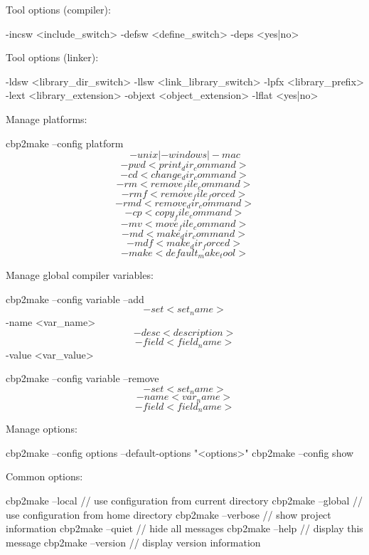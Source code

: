 Tool options (compiler):
\begin{code}
    -incsw <include_switch> -defsw <define_switch> -deps <yes|no>
\end{code}

Tool options (linker):
\begin{code}
    -ldsw <library_dir_switch> -llsw <link_library_switch> -lpfx <library_prefix>
    -lext <library_extension> -objext <object_extension> -lflat <yes|no>
\end{code}

Manage platforms:
\begin{code}
cbp2make --config platform \[-unix|-windows|-mac\] \[-pwd <print_dir_command>\]
         \[-cd <change_dir_command>\] \[-rm <remove_file_command>\]
         \[-rmf <remove_file_forced>\] \[-rmd <remove_dir_command>\]
         \[-cp <copy_file_command>\] \[-mv <move_file_command>\]
         \[-md <make_dir_command>\] \[-mdf <make_dir_forced>\]
         \[-make <default_make_tool>\]         
\end{code}

\begin{samepage}
Manage global compiler variables:
\begin{code}
cbp2make --config variable --add \[-set <set_name>\] -name <var_name>
        \[-desc <description>\] \[-field <field_name>\] -value <var_value>
        
cbp2make --config variable --remove \[-set <set_name>\] \[-name <var_name>\]
        \[-field <field_name>\]
\end{code}
\end{samepage}

Manage options:
\begin{code}
cbp2make --config options --default-options "<options>"    
cbp2make --config show
\end{code}

Common options:
\begin{code}
cbp2make --local         // use configuration from current directory
cbp2make --global        // use configuration from home directory
cbp2make --verbose       // show project information
cbp2make --quiet         // hide all messages
cbp2make --help          // display this message
cbp2make --version       // display version information
\end{code}


